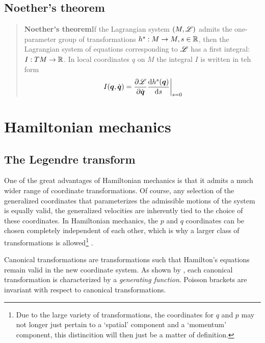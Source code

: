 \subsection{Noether's theorem}

\begin{quote}
    \textbf{Noether's theorem}\quad If the Lagrangian system $(M, \mathscr{L})$ admits the one-parameter group of transformations $h^s: M \to M, s \in \mathbb{R}$, then the Lagrangian system of equations corresponding to $\mathscr{L}$ has a first integral: $I: TM \to \mathbb{R}$. In local coordinates $q$ on $M$ the integral $I$ is written in teh form 
    $$ \left. I(\vb*{q}, \dot{\vb*{q}}) = \pdv{\ensuremath{\mathscr{L}}}{\ensuremath{\dot{\vb*{q}}}}\dv{h^s(\ensuremath{\vb*{q}})}{s}\right |_{s = 0} $$
\end{quote}

\section{Hamiltonian mechanics}

\subsection{The Legendre transform}
One of the great advantages of Hamiltonian mechanics is that it admits a much wider range of coordinate transformations. Of course, any selection of the generalized coordinates that parameterizes the admissible motions of the system is equally valid, the generalized velocities are inherently tied to the choice of these coordinates. In Hamiltonian mechanics, the \(p\) and \(q\) coordinates can be chosen completely independent of each other, which is why a larger class of transformations is allowed\footnote{Due to the large variety of transformations, the coordinates for \(q\) and \(p\) may not longer just pertain to a `spatial' component and a `momentum' component, this distincition will then just be a matter of definition.} \cite{Landau1960}.

Canonical transformations are transformations such that Hamilton's equations remain valid in the new coordinate system. As shown by \citet{Landau1960}, each canonical transformation is characterized by a \emph{generating function}. Poisson brackets are invariant with respect to canonical transformations.


